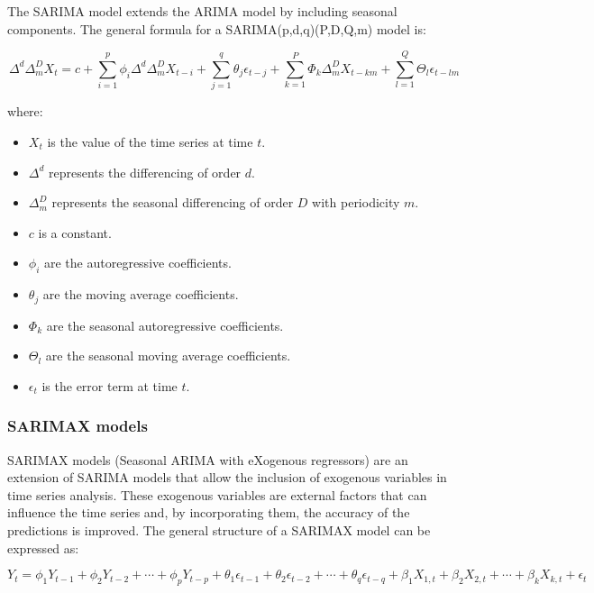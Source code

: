 The SARIMA model extends the ARIMA model by including seasonal components. The general formula for a SARIMA(p,d,q)(P,D,Q,m) model is:

\begin{equation}
\Delta^d \Delta_m^D X_t = c + \sum_{i=1}^{p} \phi_i \Delta^d \Delta_m^D X_{t-i} + \sum_{j=1}^{q} \theta_j \epsilon_{t-j} + \sum_{k=1}^{P} \Phi_k \Delta_m^D X_{t-km} + \sum_{l=1}^{Q} \Theta_l \epsilon_{t-lm}
\end{equation}

where:
\begin{itemize}
    \item \( X_t \) is the value of the time series at time \( t \).
    \item \( \Delta^d \) represents the differencing of order \( d \).
    \item \( \Delta_m^D \) represents the seasonal differencing of order \( D \) with periodicity \( m \).
    \item \( c \) is a constant.
    \item \( \phi_i \) are the autoregressive coefficients.
    \item \( \theta_j \) are the moving average coefficients.
    \item \( \Phi_k \) are the seasonal autoregressive coefficients.
    \item \( \Theta_l \) are the seasonal moving average coefficients.
    \item \( \epsilon_t \) is the error term at time \( t \).
\end{itemize}
\vspace{10pt}

\subsubsection{SARIMAX models}

SARIMAX models (Seasonal ARIMA with eXogenous regressors) are an extension of SARIMA models that allow the inclusion of exogenous variables in time series analysis. These exogenous variables are external factors that can influence the time series and, by incorporating them, the accuracy of the predictions is improved. The general structure of a SARIMAX model can be expressed as:

\begin{equation}
Y_t = \phi_1 Y_{t-1} + \phi_2 Y_{t-2} + \cdots + \phi_p Y_{t-p} + \theta_1 \epsilon_{t-1} + \theta_2 \epsilon_{t-2} + \cdots + \theta_q \epsilon_{t-q} + \beta_1 X_{1,t} + \beta_2 X_{2,t} + \cdots + \beta_k X_{k,t} + \epsilon_t
\end{equation}

